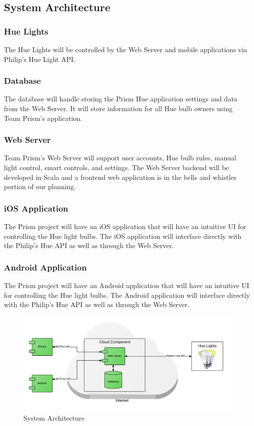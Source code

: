 \documentclass[12pt]{article}
\begin{document}
\subsection{System Architecture}   

\subsubsection*{Hue Lights}
The Hue Lights will be controlled by the Web Server and mobile applications via Philip's Hue Light API.

\subsubsection*{Database}
The database will handle storing the Prism Hue application settings and data from the Web Server.  It will store information for all Hue bulb owners using Team Prism's application.

\subsubsection*{Web Server}
Team Prism's Web Server will support user accounts, Hue bulb rules, manual light control, smart controls, and settings. The Web Server backend will be developed in Scala and a frontend web application is in the bells and whistles portion of our planning.  

\subsubsection*{iOS Application}
The Prism project will have an iOS application that will have an intuitive UI for controlling the Hue light bulbs.  The iOS application will interface directly with the Philip's Hue API as well as through the Web Server.

\subsubsection*{Android Application}
The Prism project will have an Android application that will have an intuitive UI for controlling the Hue light bulbs.  The Android application will interface directly with the Philip's Hue API as well as through the Web Server.
\begin{figure}[ht!]
    \centering
    \includegraphics[width=130mm]{System_Architecture_-_System_Architecture.png}
    \caption{System Architecture}
  \end{figure}
\FloatBarrier
\end{document}
